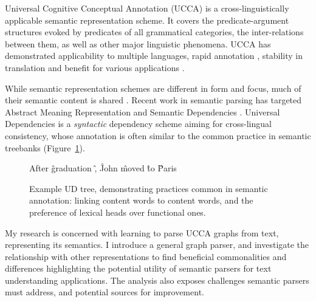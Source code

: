 \documentclass[12pt]{article}
\begin{document}
Universal Cognitive Conceptual Annotation (UCCA)
is a cross-linguistically applicable semantic representation scheme.
It covers the predicate-argument
structures evoked by predicates of all grammatical categories, the inter-relations between them,
as well as other major linguistic phenomena.
UCCA has demonstrated applicability to multiple languages,
rapid annotation \cite{abend2017uccaapp},
stability in translation \cite{sulem2015conceptual}
and benefit for various applications
\cite{birch2016hume,choshen2018usim,sulem2018samsa,sulem2018simple}.

While semantic representation schemes are different in form and focus,
much of their semantic content is shared \cite{abend2017state}.
Recent work in semantic parsing has targeted
Abstract Meaning Representation \cite{banarescu2013abstract} and
Semantic Dependencies \cite{oepen2016towards}.
Universal Dependencies \cite{nivre2016universal}
is a \textit{syntactic} dependency scheme aiming for cross-lingual consistency,
whose annotation is often similar to the common practice in semantic treebanks
(Figure~\ref{fig:original_example_ud}).

\begin{figure}[th]
  \centering
    \begin{dependency}[text only label, label style={above,font=\tt}, font=\small]
    \begin{deptext}[column sep=.8em,ampersand replacement=\^]
    After \^ graduation \^ , \^ John \^ moved \^ to \^ Paris \\
    \end{deptext}
    \end{dependency}
\caption{Example UD tree, demonstrating practices common in semantic annotation:
linking content words to content words, and the preference of lexical heads over functional ones.
\label{fig:original_example_ud}}
\end{figure}

My research is concerned with learning to parse UCCA graphs from text, representing its semantics.
I introduce a general graph parser,
and investigate the relationship with other representations to find beneficial commonalities and
differences highlighting the potential utility of semantic parsers for text understanding applications.
The analysis also exposes challenges semantic parsers must address,
and potential sources for improvement.
\end{document}
